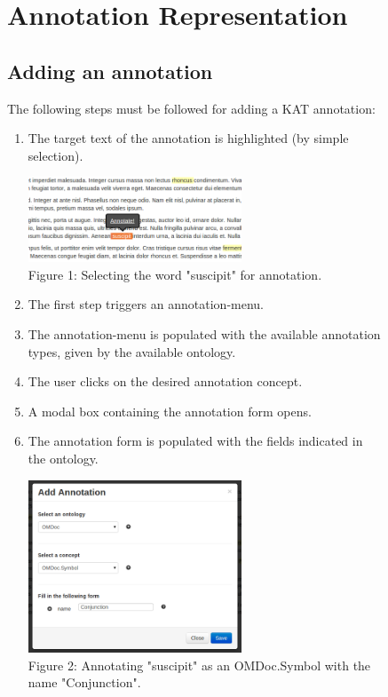 \documentclass[a4paper, 12pt, notitlepage]{report}
\def\KAT{\textsf{KAT}\xspace}
\begin{document}
\begin{figure}[ht]
\section{Annotation Representation}

\subsection{Adding an annotation}

The following steps must be followed for adding a \KAT annotation:
\begin{enumerate}
\item The target text of the annotation is highlighted (by simple selection).
\begin{center}
  \includegraphics[width=2.5in]{annotate.png} \\
  \tiny{Figure 1: Selecting the word "suscipit" for annotation.}
\end{center}

\item The first step triggers an annotation-menu.
\item The annotation-menu is populated with the available annotation types, given by the
  available ontology.
\item The user clicks on the desired annotation concept.
\item A modal box containing the annotation form opens.
\item The annotation form is populated with the fields indicated in the ontology.
\begin{center}
 \includegraphics[width=2.5in]{add-symbol.png} \\
 \tiny{Figure 2: Annotating "suscipit" as an OMDoc.Symbol with the name "Conjunction".}
\end{center}


\end{enumerate}
\end{figure}
\end{document}
